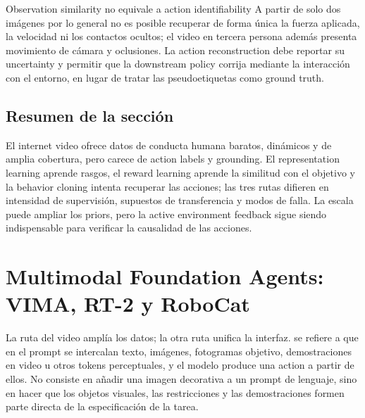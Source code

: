 \documentclass[a4paper]{article}
\begin{document}
\begin{warningbox}{Observation similarity no equivale a action identifiability}
A partir de solo dos imágenes por lo general no es posible recuperar de forma única la fuerza aplicada, la velocidad ni los contactos ocultos; el video en tercera persona además presenta movimiento de cámara y oclusiones. La action reconstruction debe reportar su uncertainty y permitir que la downstream policy corrija mediante la interacción con el entorno, en lugar de tratar las pseudoetiquetas como ground truth.
\end{warningbox}


\subsection{Resumen de la sección}

El internet video ofrece datos de conducta humana baratos, dinámicos y de amplia cobertura, pero carece de action labels y grounding. El representation learning aprende rasgos, el reward learning aprende la similitud con el objetivo y la behavior cloning intenta recuperar las acciones; las tres rutas difieren en intensidad de supervisión, supuestos de transferencia y modos de falla. La escala puede ampliar los priors, pero la active environment feedback sigue siendo indispensable para verificar la causalidad de las acciones.
\section{Multimodal Foundation Agents: VIMA, RT-2 y RoboCat}

La ruta del video amplía los datos; la otra ruta unifica la interfaz.  se refiere a que en el prompt se intercalan texto, imágenes, fotogramas objetivo, demostraciones en video u otros tokens perceptuales, y el modelo produce una action a partir de ellos. No consiste en añadir una imagen decorativa a un prompt de lenguaje, sino en hacer que los objetos visuales, las restricciones y las demostraciones formen parte directa de la especificación de la tarea.
\end{document}
